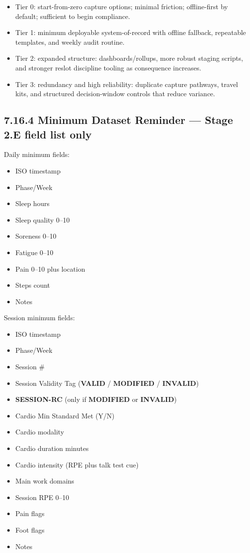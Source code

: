 \documentclass[10pt]{article}
\begin{document}
\begin{itemize}
\item Tier 0: start-from-zero capture options; minimal friction; offline-first by default; sufficient to begin compliance.
\item Tier 1: minimum deployable system-of-record with offline fallback, repeatable templates, and weekly audit routine.
\item Tier 2: expanded structure: dashboards/rollups, more robust staging scripts, and stronger reslot discipline tooling as consequence increases.
\item Tier 3: redundancy and high reliability: duplicate capture pathways, travel kits, and structured decision-window controls that reduce variance.
\end{itemize}

\subsection*{7.16.4 Minimum Dataset Reminder — Stage 2.E field list only}
{}

Daily minimum fields:

\begin{itemize}
\item ISO timestamp
\item Phase/Week
\item Sleep hours
\item Sleep quality 0–10
\item Soreness 0–10
\item Fatigue 0–10
\item Pain 0–10 plus location
\item Steps count
\item Notes
\end{itemize}

Session minimum fields:

\begin{itemize}
\item ISO timestamp
\item Phase/Week
\item Session \#
\item Session Validity Tag (\textbf{VALID} / \textbf{MODIFIED} / \textbf{INVALID})
\item \textbf{SESSION-RC} (only if \textbf{MODIFIED} or \textbf{INVALID})
\item Cardio Min Standard Met (Y/N)
\item Cardio modality
\item Cardio duration minutes
\item Cardio intensity (RPE plus talk test cue)
\item Main work domains
\item Session RPE 0–10
\item Pain flags
\item Foot flags
\item Notes
\end{itemize}
\end{document}
